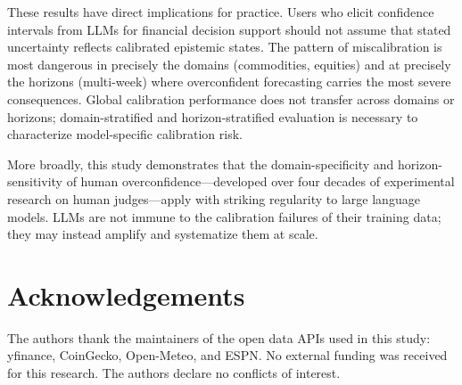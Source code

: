 These results have direct implications for practice. Users who elicit confidence
intervals from LLMs for financial decision support should not assume that stated
uncertainty reflects calibrated epistemic states. The pattern of miscalibration is most
dangerous in precisely the domains (commodities, equities) and at precisely the horizons
(multi-week) where overconfident forecasting carries the most severe consequences.
Global calibration performance does not transfer across domains or horizons;
domain-stratified and horizon-stratified evaluation is necessary to characterize
model-specific calibration risk.

More broadly, this study demonstrates that the domain-specificity and
horizon-sensitivity of human overconfidence---developed over four decades of experimental
research on human judges---apply with striking regularity to large language models. LLMs
are not immune to the calibration failures of their training data; they may instead
amplify and systematize them at scale.


\section*{Acknowledgements}

The authors thank the maintainers of the open data APIs used in this study:
yfinance, CoinGecko, Open-Meteo, and ESPN. No external funding was received
for this research. The authors declare no conflicts of interest.
